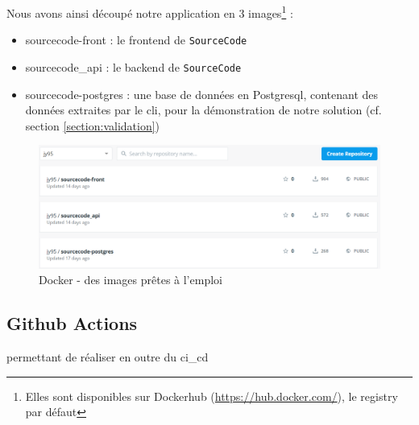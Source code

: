 Nous avons ainsi découpé notre application en 3 images\footnote{
    Elles sont disponibles sur Dockerhub (\url{https://hub.docker.com/}), le registry par défaut
} :

\begin{itemize}[nosep,noitemsep,topsep=0pt,partopsep=0pt,after=\vspace*{2pt}]
    \item sourcecode-front : le \gls{frontend} de \texttt{SourceCode}
    \item sourcecode\_api : le \gls{backend} de \texttt{SourceCode}
    \item sourcecode-postgres : une base de données en Postgresql, contenant des données extraites par le \Gls{cli}, pour la démonstration de notre solution (cf. section \ref{section:validation})
\end{itemize}

\begin{figure}[H]
    \includegraphics[width=\textwidth,height=0.16\textheight,keepaspectratio]{images/serveur/dockerHub.PNG}
    \centering
    \caption{Docker - des images prêtes à l'emploi}
    \label{fig:dockerImages}
\end{figure}

\pagebreak
\subsection{Github Actions}

permettant de réaliser en outre du \gls{ci_cd}

